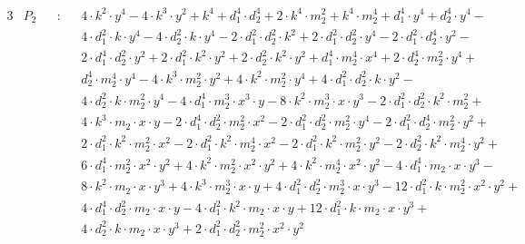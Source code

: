 \begin{alignat*}{3}
  & P_2 && : && 4 \cdot k^2 \cdot y^4
    - 4 \cdot k^3 \cdot y^2
    + k^4 + d_1^4 \cdot d_2^4
    + 2 \cdot k^4 \cdot m_2^2
    + k^4 \cdot m_2^4
    + d_1^4 \cdot y^4
    + d_2^4 \cdot y^4 -\\
  & && && 4 \cdot d_1^2 \cdot k \cdot y^4
    - 4 \cdot d_2^2 \cdot k \cdot y^4
    - 2 \cdot d_1^2 \cdot d_2^2 \cdot k^2
    + 2 \cdot d_1^2 \cdot d_2^2 \cdot y^4
    - 2 \cdot d_1^2 \cdot d_2^4 \cdot y^2 -\\
  & && && 2 \cdot d_1^4 \cdot d_2^2 \cdot y^2
    + 2 \cdot d_1^2 \cdot k^2 \cdot y^2
    + 2 \cdot d_2^2 \cdot k^2 \cdot y^2
    + d_1^4 \cdot m_2^4 \cdot x^4
    + 2 \cdot d_2^4 \cdot m_2^2 \cdot y^4 +\\
  & && && d_2^4 \cdot m_2^4 \cdot y^4
    - 4 \cdot k^3 \cdot m_2^2 \cdot y^2
    + 4 \cdot k^2 \cdot m_2^2 \cdot y^4
    + 4 \cdot d_1^2 \cdot d_2^2 \cdot k \cdot y^2 - \\
  & && && 4 \cdot d_2^2 \cdot k \cdot m_2^2 \cdot y^4
    - 4 \cdot d_1^4 \cdot m_2^3 \cdot x^3 \cdot y
    - 8 \cdot k^2 \cdot m_2^3 \cdot x \cdot y^3
    - 2 \cdot d_1^2 \cdot d_2^2 \cdot k^2 \cdot m_2^2 +\\
  & && && 4 \cdot k^3 \cdot m_2 \cdot x \cdot y
    - 2 \cdot d_1^4 \cdot d_2^2 \cdot m_2^2 \cdot x^2
    - 2 \cdot d_1^2 \cdot d_2^2 \cdot m_2^2 \cdot y^4
    - 2 \cdot d_1^2 \cdot d_2^4 \cdot m_2^2 \cdot y^2+\\
  & && && 2 \cdot d_1^2 \cdot k^2 \cdot m_2^2 \cdot x^2
    - 2 \cdot d_1^2 \cdot k^2 \cdot m_2^4 \cdot x^2
    - 2 \cdot d_1^2 \cdot k^2 \cdot m_2^2 \cdot y^2
    - 2 \cdot d_2^2 \cdot k^2 \cdot m_2^4 \cdot y^2 +\\
  & && && 6 \cdot d_1^4 \cdot m_2^2 \cdot x^2 \cdot y^2
    + 4 \cdot k^2 \cdot m_2^2 \cdot x^2 \cdot y^2
    + 4 \cdot k^2 \cdot m_2^4 \cdot x^2 \cdot y^2
    - 4 \cdot d_1^4 \cdot m_2 \cdot x \cdot y^3 -\\
  & && && 8 \cdot k^2 \cdot m_2 \cdot x \cdot y^3
    + 4 \cdot k^3 \cdot m_2^3 \cdot x \cdot y
    + 4 \cdot d_1^2 \cdot d_2^2 \cdot m_2^3 \cdot x \cdot y^3
    - 12 \cdot d_1^2 \cdot k \cdot m_2^2 \cdot x^2 \cdot y^2 +\\
  & && && 4 \cdot d_1^4 \cdot d_2^2 \cdot m_2 \cdot x \cdot y
    - 4 \cdot d_1^2 \cdot k^2 \cdot m_2 \cdot x \cdot y
    + 12 \cdot d_1^2 \cdot k \cdot m_2 \cdot x \cdot y^3 +\\
  & && && 4 \cdot d_2^2 \cdot k \cdot m_2 \cdot x \cdot y^3
    + 2 \cdot d_1^2 \cdot d_2^2 \cdot m_2^2 \cdot x^2 \cdot y^2

\end{alignat*}
